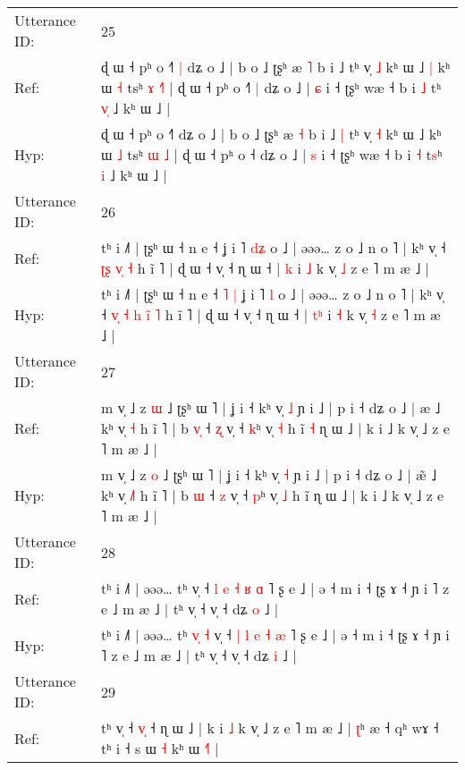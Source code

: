 \documentclass[10pt]{article}
\DeclareRobustCommand{\hl}[1]{{\textcolor{red}{#1}}}
\begin{document}
\begin{longtable}{ll}
 \\
\midrule
Utterance ID: & 25 \\
Ref: & ɖ ɯ ˧ pʰ o ˧˥\hl{ }\hl{|} dʑ o ˩ | b o ˩ ʈʂʰ æ \hl{˥} b i ˩\hl{}\hl{} tʰ v̩ \hl{˩} kʰ ɯ ˩\hl{ }\hl{|} kʰ ɯ \hl{˧} tsʰ \hl{ɤ} \hl{˧}\hl{˥} | ɖ ɯ ˧ pʰ o ˧\hl{˥}\hl{ }\hl{|} dʑ o ˩ | \hl{ɕ} i ˧ ʈʂʰ wæ ˧ b i \hl{˩} t\hl{}ʰ \hl{v}\hl{̩} ˩ kʰ ɯ ˩ |
 \\
Hyp: & ɖ ɯ ˧ pʰ o ˧˥\hl{}\hl{} dʑ o ˩ | b o ˩ ʈʂʰ æ \hl{˧} b i ˩\hl{ }\hl{|} tʰ v̩ \hl{˧} kʰ ɯ ˩\hl{}\hl{} kʰ ɯ \hl{˩} tsʰ \hl{ɯ} \hl{}\hl{˩} | ɖ ɯ ˧ pʰ o ˧\hl{}\hl{}\hl{} dʑ o ˩ | \hl{s} i ˧ ʈʂʰ wæ ˧ b i \hl{˧} t\hl{s}ʰ \hl{}\hl{i} ˩ kʰ ɯ ˩ |
 \\
\midrule
Utterance ID: & 26 \\
Ref: & tʰ i ˩˥ | ʈʂʰ ɯ ˧ n e ˧\hl{}\hl{}\hl{}\hl{} ʝ i ˥ \hl{d}\hl{ʑ} o ˩ | əəə… z o ˩ n o ˥ | kʰ v̩ ˧\hl{}\hl{}\hl{} \hl{}\hl{ʈ}\hl{ʂ} \hl{v}\hl{̩} \hl{˧} h ĩ ˥ | ɖ ɯ ˧ v̩ ˧ ɳ ɯ ˧ | \hl{}\hl{k} i \hl{˩} k v̩ \hl{˩} z e ˥ m æ ˩ |
 \\
Hyp: & tʰ i ˩˥ | ʈʂʰ ɯ ˧ n e ˧\hl{ }\hl{˥}\hl{ }\hl{|} ʝ i ˥ \hl{}\hl{l} o ˩ | əəə… z o ˩ n o ˥ | kʰ v̩ ˧\hl{ }\hl{v}\hl{̩} \hl{˧}\hl{ }\hl{h} \hl{i}\hl{̃} \hl{˥} h ĩ ˥ | ɖ ɯ ˧ v̩ ˧ ɳ ɯ ˧ | \hl{t}\hl{ʰ} i \hl{˧} k v̩ \hl{˧} z e ˥ m æ ˩ |
 \\
\midrule
Utterance ID: & 27 \\
Ref: & m v̩ ˩ z \hl{ɯ} ˩ ʈʂʰ ɯ ˥ | ʝ i ˧ kʰ v̩ \hl{˩} ɲ i ˩ | p i ˧ dʑ o ˩ | æ\hl{} ˩ kʰ v̩ \hl{}\hl{˧} h ĩ ˥ | b \hl{v}\hl{̩} ˧ \hl{ʐ} v̩ ˧ \hl{k}ʰ v̩ \hl{˧} h ĩ\hl{ }\hl{˧} ɳ ɯ ˩ | k i ˩ k v̩ ˩ z e ˥ m æ ˩ |
 \\
Hyp: & m v̩ ˩ z \hl{o} ˩ ʈʂʰ ɯ ˥ | ʝ i ˧ kʰ v̩ \hl{˧} ɲ i ˩ | p i ˧ dʑ o ˩ | æ\hl{̃} ˩ kʰ v̩ \hl{˩}\hl{˥} h ĩ ˥ | b \hl{}\hl{ɯ} ˧ \hl{z} v̩ ˧ \hl{p}ʰ v̩ \hl{˩} h ĩ\hl{}\hl{} ɳ ɯ ˩ | k i ˩ k v̩ ˩ z e ˥ m æ ˩ |
 \\
\midrule
Utterance ID: & 28 \\
Ref: & tʰ i ˩˥ | əəə… tʰ\hl{}\hl{}\hl{}\hl{}\hl{} v̩ ˧ \hl{l} \hl{e} \hl{˧} \hl{ʁ} \hl{ɑ} ˥ ʂ e ˩ | ə ˧ m i ˧ ʈʂ ɤ ˧ ɲ i ˥ z e ˩ m æ ˩ | tʰ v̩ ˧ v̩ ˧ dʑ \hl{o} ˩ |
 \\
Hyp: & tʰ i ˩˥ | əəə… tʰ\hl{ }\hl{v}\hl{̩}\hl{ }\hl{˧} v̩ ˧ \hl{|} \hl{l} \hl{e} \hl{˧} \hl{æ} ˥ ʂ e ˩ | ə ˧ m i ˧ ʈʂ ɤ ˧ ɲ i ˥ z e ˩ m æ ˩ | tʰ v̩ ˧ v̩ ˧ dʑ \hl{i} ˩ |
 \\
\midrule
Utterance ID: & 29 \\
Ref: & tʰ v̩ ˧ \hl{v}\hl{̩} ˧ ɳ ɯ ˩ | k\hl{}\hl{}\hl{}\hl{} i \hl{˩} k v̩ ˩ z e ˥ m æ ˩ | \hl{ʈ}ʰ æ ˧ qʰ wɤ ˧\hl{}\hl{} tʰ i ˧ s ɯ \hl{˧} kʰ ɯ \hl{˧}\hl{˥} |

\end{longtable}
\end{document}
